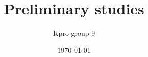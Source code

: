 \documentclass[a4paper, 11pt]{report}
\title{Preliminary studies}
\author{Kpro group 9}
\date{\today}
\begin{document}
\makeglossaries


\tableofcontents

\end{document}
